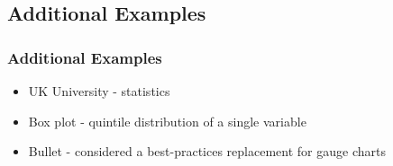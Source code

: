 \documentclass{beamer}
\begin{document}
\subsection{Additional Examples}

\begin{frame}
\frametitle{Additional Examples}
\begin{itemize}
\item UK University - statistics
\item Box plot - quintile distribution of a single variable
\item Bullet - considered a best-practices replacement for gauge charts
\end{itemize}
\end{frame}





\end{document}
